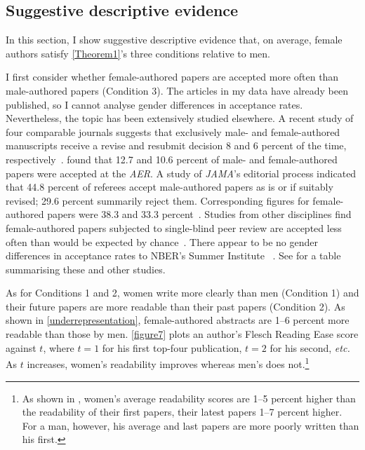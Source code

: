\subsection{Suggestive descriptive evidence}
\label{mechanismsdescriptive}

In this section, I show suggestive descriptive evidence that, on average, female authors satisfy \autoref{Theorem1}'s three conditions relative to men.



I first consider whether female-authored papers are accepted more often than male-authored papers (Condition 3). The articles in my data have already been published, so I cannot analyse gender differences in acceptance rates. Nevertheless, the topic has been extensively studied elsewhere. A recent study of four comparable journals suggests that exclusively male- and female-authored manuscripts receive a revise and resubmit decision 8 and 6 percent of the time, respectively~\citep{Card2020}.  \citet{Blank1991} found that 12.7 and 10.6 percent of male- and female-authored papers were accepted at the \emph{AER}. A study of \emph{JAMA}'s editorial process indicated that 44.8 percent of referees accept male-authored papers as is or if suitably revised; 29.6 percent summarily reject them. Corresponding figures for female-authored papers were 38.3 and 33.3 percent~\citep{Gilbert1994}. Studies from other disciplines find female-authored papers subjected to single-blind peer review are accepted less often than would be expected by chance~\citep{McGillivray2018,Handley2015}. There appear to be no gender differences in acceptance rates to NBER's Summer Institute ~\citep{Chari2017}. See  for a table summarising these and other studies.

As for Conditions 1 and 2, women write more clearly than men (Condition 1) and their future papers are more readable than their past papers (Condition 2). As shown in \autoref{underrepresentation}, female-authored abstracts are 1–6 percent more readable than those by men. \autoref{figure7} plots an author's Flesch Reading Ease score against $t$, where $t=1$ for his first top-four publication, $t=2$ for his second, \emph{etc.} As $t$ increases, women's readability improves whereas men's does not.\footnote{As shown in , women's average readability scores are 1--5 percent higher than the readability of their first papers, their latest papers 1--7 percent higher. For a man, however, his average and last papers are more poorly written than his first.}

